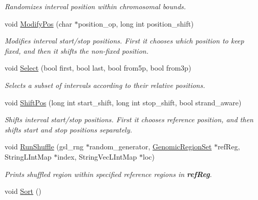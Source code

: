 \begin{DoxyCompactItemize}
\begin{DoxyCompactList}\small\item\em Randomizes interval position within chromosomal bounds. \end{DoxyCompactList}\item 
void \hyperlink{classGenomicRegionSAM_a353207352073db00dee0a9b620dca197}{ModifyPos} (char $\ast$position\_\-op, long int position\_\-shift)
\begin{DoxyCompactList}\small\item\em Modifies interval start/stop positions. First it chooses which position to keep fixed, and then it shifts the non-\/fixed position. \end{DoxyCompactList}\item 
\hypertarget{classGenomicRegionSAM_a4dce925fdb55dcc7ef3dad890bc25408}{
void \hyperlink{classGenomicRegionSAM_a4dce925fdb55dcc7ef3dad890bc25408}{Select} (bool first, bool last, bool from5p, bool from3p)}
\label{classGenomicRegionSAM_a4dce925fdb55dcc7ef3dad890bc25408}

\begin{DoxyCompactList}\small\item\em Selects a subset of intervals according to their relative positions. \end{DoxyCompactList}\item 
void \hyperlink{classGenomicRegionSAM_afb2701ba1a521ae2c07ea0ace2f9ee77}{ShiftPos} (long int start\_\-shift, long int stop\_\-shift, bool strand\_\-aware)
\begin{DoxyCompactList}\small\item\em Shifts interval start/stop positions. First it chooses reference position, and then shifts start and stop positions separately. \end{DoxyCompactList}\item 
\hypertarget{classGenomicRegionSAM_ab31fed1760d543fa3a38bb16a064dcf9}{
void \hyperlink{classGenomicRegionSAM_ab31fed1760d543fa3a38bb16a064dcf9}{RunShuffle} (gsl\_\-rng $\ast$random\_\-generator, \hyperlink{classGenomicRegionSet}{GenomicRegionSet} $\ast$refReg, StringLIntMap $\ast$index, StringVecLIntMap $\ast$loc)}
\label{classGenomicRegionSAM_ab31fed1760d543fa3a38bb16a064dcf9}

\begin{DoxyCompactList}\small\item\em Prints shuffled region within specified reference regions in {\bfseries refReg}. \end{DoxyCompactList}\item 
\hypertarget{classGenomicRegionSAM_a8a27afdcdf11895d7b3f32bd8eed68ae}{
void \hyperlink{classGenomicRegionSAM_a8a27afdcdf11895d7b3f32bd8eed68ae}{Sort} ()}
\label{classGenomicRegionSAM_a8a27afdcdf11895d7b3f32bd8eed68ae}


\end{DoxyCompactItemize}
